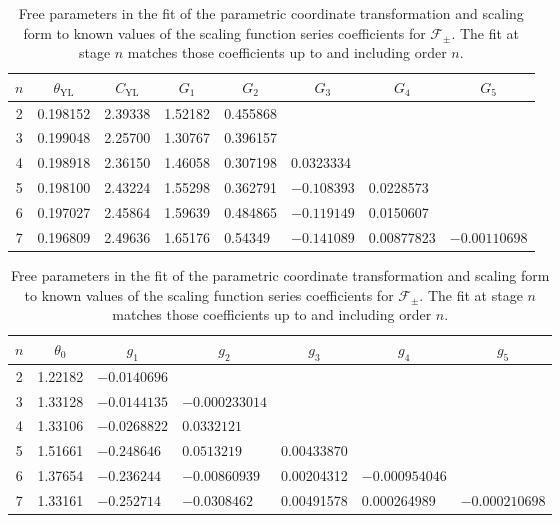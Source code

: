 \documentclass[
aps,
pre,
preprint,
longbibliography,
floatfix
]{revtex4-2}
\begin{document}
\begin{table}
  \singlespacing
  \raggedright
  \begin{tabular}{|c|lllllll}
    \hline
    \multicolumn{1}{|c|}{$n$} &
      \multicolumn{1}{c}{$\theta_\mathrm{YL}$} &
      \multicolumn{1}{c}{$C_\mathrm{YL}$} &
      \multicolumn{1}{c}{$G_1$} &
      \multicolumn{1}{c}{$G_2$} &
      \multicolumn{1}{c}{$G_3$} &
      \multicolumn{1}{c}{$G_4$} &
      \multicolumn{1}{c}{$G_5$} \\
    \hline
    2 &
      0.198152 &
      2.39338 &
      1.52182 &
      0.455868 \\
    3 &
      0.199048 &
      2.25700 &
      1.30767 &
      0.396157 \\
    4 &
      0.198918 &
      2.36150 &
      1.46058 &
      0.307198 &
      \hphantom{$-$}0.0323334 \\
    5 &
      0.198100 &
      2.43224 &
      1.55298 &
      0.362791 &
      $-0.108393$ &
      0.0228573 \\
    6 &
      0.197027 &
      2.45864 &
      1.59639 &
      0.484865 &
      $-0.119149$ &
      0.0150607 \\
    7 &
      0.196809 &
      2.49636 &
      1.65176 &
      0.54349 &
      $-0.141089$ &
      0.00877823 &
      $-0.00110698$ \\
      \hline
    \end{tabular}
    \begin{tabular}{|c|llllll}
      \hline
      $n$ &
        \multicolumn{1}{c}{$\theta_0$} &
        \multicolumn{1}{c}{$g_1$} &
        \multicolumn{1}{c}{$g_2$} &
        \multicolumn{1}{c}{$g_3$} &
        \multicolumn{1}{c}{$g_4$} &
        \multicolumn{1}{c}{$g_5$} \\
      \hline
      2 &
        1.22182 &
        $-0.0140696$ \\
      3 &
        1.33128 &
        $-0.0144135$ &
        $-0.000233014$ \\
      4 &
        1.33106 &
        $-0.0268822$ &
        \hphantom{$-$}$0.0332121$ \\
      5 &
        1.51661 &
        $-0.248646$ &
        \hphantom{$-$}$0.0513219$ &
        $0.00433870$ \\
      6 &
        1.37654 &
        $-0.236244$ &
        $-0.00860939$ &
        0.00204312 &
        $-0.000954046$ \\
      7 &
        1.33161 &
        $-0.252714$ &
        $-0.0308462$ &
        0.00491578 &
        \hphantom{$-$}0.000264989 &
        $-0.000210698$ \\
      \hline
  \end{tabular}
  \caption{
    Free parameters in the fit of the parametric coordinate transformation and
    scaling form to known values of the scaling function series coefficients
    for $\mathcal F_\pm$. The fit at stage $n$ matches those coefficients up to
    and including order $n$.
  } \label{tab:fits}
\end{table}
\end{document}
